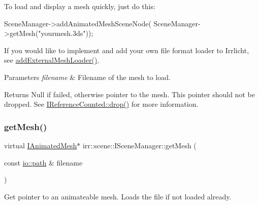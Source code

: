 To load and display a mesh quickly, just do this\+: 
\begin{DoxyCode}
SceneManager->addAnimatedMeshSceneNode(
   SceneManager->getMesh(\textcolor{stringliteral}{"yourmesh.3ds"}));
\end{DoxyCode}
 If you would like to implement and add your own file format loader to Irrlicht, see \hyperlink{classirr_1_1scene_1_1ISceneManager_a808972cc001db86c0576c38b3b3fbbf7}{add\+External\+Mesh\+Loader()}. 
\begin{DoxyParams}{Parameters}
{\em filename} & Filename of the mesh to load. \\
\hline
\end{DoxyParams}
\begin{DoxyReturn}{Returns}
Null if failed, otherwise pointer to the mesh. This pointer should not be dropped. See \hyperlink{classirr_1_1IReferenceCounted_a03856a09355b89d178090c4a5f738543}{I\+Reference\+Counted\+::drop()} for more information. 
\end{DoxyReturn}
\mbox{\label{classirr_1_1scene_1_1ISceneManager_a63894c3f3d46cfc385116f1705935e03}} 
\subsubsection{\texorpdfstring{get\+Mesh()}{getMesh()}\hspace{0.1cm}{\footnotesize\ttfamily [2/4]}}
{\footnotesize\ttfamily virtual \hyperlink{classirr_1_1scene_1_1IAnimatedMesh}{I\+Animated\+Mesh}$\ast$ irr\+::scene\+::\+I\+Scene\+Manager\+::get\+Mesh (\begin{DoxyParamCaption}\item[{const \hyperlink{namespaceirr_1_1io_a6468281622ce3a1c46b72e19f32dded5}{io\+::path} \&}]{filename }\end{DoxyParamCaption})\hspace{0.3cm}{\ttfamily [pure virtual]}}



Get pointer to an animateable mesh. Loads the file if not loaded already. 

